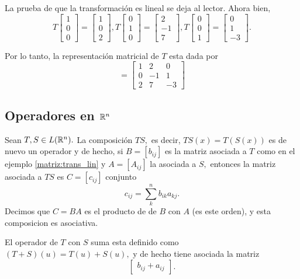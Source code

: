 \begin{solucion}
 La prueba de que la transformaci\'on es lineal se deja al lector. Ahora bien,
 $$
T\begin{bmatrix}
  1\\0\\0
 \end{bmatrix}
=\begin{bmatrix}
  1\\0\\2
 \end{bmatrix},
 T\begin{bmatrix}
  0\\1\\0
 \end{bmatrix}
=\begin{bmatrix}
  2\\-1\\7
 \end{bmatrix},
T\begin{bmatrix}
  0\\0\\1
 \end{bmatrix}
=\begin{bmatrix}
  0\\1\\-3
 \end{bmatrix}.
 $$

 Por lo tanto, la representaci\'on matricial de $T$ esta dada por
 $$
=\begin{bmatrix}
1 & 2 & 0 \\
0 & -1 & 1 \\
2 & 7 & -3
 \end{bmatrix}
 $$
\end{solucion}


\subsection*{Operadores en  $\mathbb{R}^{n}$}

Sean $T,S \in L(\mathbb{R}^{n}).$ La composici\'on $TS,$ es decir, $TS(x)=T(S(x))$ es de nuevo un operador y de hecho, si 
$B=[b_{ij}]$ es la matriz asociada a $T$ como en el ejemplo \ref{matriz:trans_lin} y $A=[A_{ij}]$ la asociada a $S,$
entonces la matriz asociada a $TS$ es $C=[c_{ij}]$ conjunto $$
c_{ij}=\sum_{k}^{n}b_{ik}a_{kj}.
$$
Decimos que $C=BA$ es el producto de de $B$ con $A$ (es este orden), y esta composicion es asociativa.

El operador de $T$ con $S$ suma esta definido como $(T+S)(u)=T(u)+S(u),$ y de hecho tiene asociada la matriz $$
\begin{bmatrix}
 b_{ij}+a_{ij}
\end{bmatrix}.
$$

